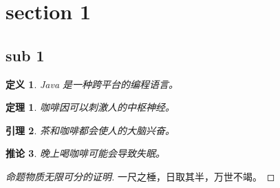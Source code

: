 \documentclass[12pt]{article}
\begin{document}
    \section{section 1}
    \subsection{sub 1}
    \newtheorem{definition}{定义}[section]
    \newtheorem{theorem}{定理}[section]
    \newtheorem{lemma}[theorem]{引理}
    \newtheorem{corollary}[theorem]{推论}
    \begin{definition}
        Java 是一种跨平台的编程语言。
    \end{definition}
    \begin{theorem}
        咖啡因可以刺激人的中枢神经。
    \end{theorem}
    \begin{lemma}
        茶和咖啡都会使人的大脑兴奋。
    \end{lemma}
    \begin{corollary}
        晚上喝咖啡可能会导致失眠。
    \end{corollary}
    
    \begin{proof}[命题物质无限可分的证明]
        一尺之棰，日取其半，万世不竭。
    \end{proof}
\end{document}
